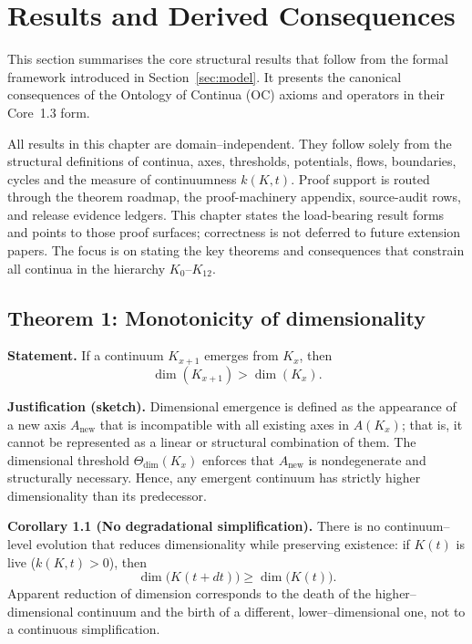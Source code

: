 
\section{Results and Derived Consequences}
\label{sec:results}

This section summarises the core structural results that follow from the formal
framework introduced in Section~\ref{sec:model}. It presents the canonical
consequences of the Ontology of Continua (OC) axioms and operators in their
Core~1.3 form.

All results in this chapter are domain–independent.
They follow solely from the structural definitions of continua, axes, thresholds, potentials, flows, boundaries, cycles and the measure of continuumness \(k(K,t)\).
Proof support is routed through the theorem roadmap, the proof-machinery
appendix, source-audit rows, and release evidence ledgers. This chapter states
the load-bearing result forms and points to those proof surfaces; correctness is
not deferred to future extension papers.
The focus is on stating the key theorems and consequences that constrain all
continua in the hierarchy \(K_0\)–\(K_{12}\).

\subsection{Theorem 1: Monotonicity of dimensionality}

\textbf{Statement.}
If a continuum \(K_{x+1}\) emerges from \(K_x\), then
\[
    \dim(K_{x+1}) > \dim(K_x).
\]

\textbf{Justification (sketch).}
Dimensional emergence is defined as the appearance of a new axis \(A_{\mathrm{new}}\) that is incompatible with all existing axes in \(A(K_x)\); that is, it cannot be represented as a linear or structural combination of them.
The dimensional threshold \(\Theta_{\mathrm{dim}}(K_x)\) enforces that \(A_{\mathrm{new}}\) is nondegenerate and structurally necessary.
Hence, any emergent continuum has strictly higher dimensionality than its predecessor.

\textbf{Corollary 1.1 (No degradational simplification).}
There is no continuum–level evolution that reduces dimensionality while preserving existence:
if \(K(t)\) is live (\(k(K,t) > 0\)), then
\[
    \dim\big(K(t+dt)\big) \ge \dim\big(K(t)\big).
\]
Apparent reduction of dimension corresponds to the death of the higher–dimensional continuum and the birth of a different, lower–dimensional one, not to a continuous simplification.

